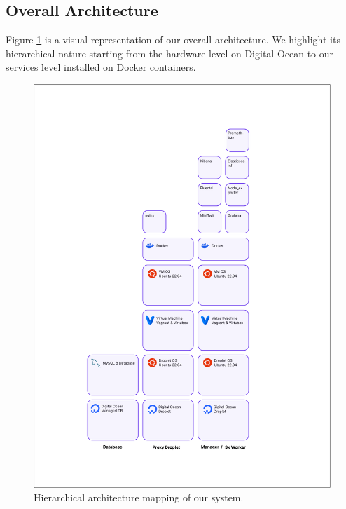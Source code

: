 \documentclass{article}
\begin{document}
\subsection{Overall Architecture}
Figure \ref{fig:high_arch} is a visual representation of our overall architecture. We highlight its hierarchical nature starting from the hardware level on Digital Ocean to our services level installed on Docker containers. 
\begin{figure}
    \centering
    \includegraphics[width=1\linewidth]{./images/hierarchy.png}
    \caption{Hierarchical architecture mapping of our system.}
    \label{fig:high_arch}
\end{figure}
\end{document}

